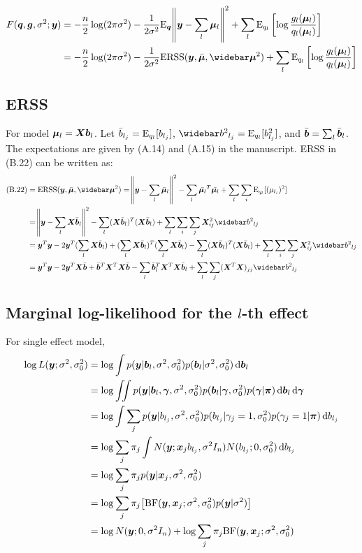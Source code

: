 \begin{align}
    F(\q,\g,\rv; \vy) &= -\frac{n}{2} \log(2\pi\rv) -\frac{1}{2\rv}\E_{\q}\norm{\vy-\sum_l \vmu_l}^2 + \sum_l \E_{q_l}\left[\log\frac{g_l(\vmu_l)}{q_l(\vmu_l)} \right] \label{eqn:Fexplicit}\\
    &= -\frac{n}{2} \log(2\pi\rv) - \frac{1}{2\rv} \ERSS(\vy,\emu,\emusq) + \sum_l \E_{q_l}\left[ \log\frac{g_l(\vmu_l)}{q_l(\vmu_l)} \right]  
\end{align}

\subsection{ERSS}

For \susie model $\bm \mu_l = \bm X \bm b_l$. Let $\bar{b}_{l_j} = \text{E}_{q_l}[b_{l_j}]$, $\bbb_{l_j} = \E_{q_l}[b^2_{l_j}]$, and $\bar{\bm{b}} = \sum_l \bar{\bm{b}}_{l}$. The expectations are given by (A.14) and (A.15) in the manuscript. ERSS in (B.22) can be written as:
\begin{align}
    \text{(B.22)} &= \ERSS(\vy,\emu,\emusq) = \norm{\vy-\sum_l \emul}^2 - \sum_l \bar{\vmu_l}^T \bar{\vmu_l} + \sum_l \sum_i \E_{q_l}[(\mu_{l_i})^2] \\
    &= \norm{\vy-\sum_l \mx \vbb_l}^2 - \sum_l (\mx \vbb_l)^T (\mx \vbb_l) + \sum_l \sum_i \sum_{j} \mx_{ij}^{2}  \bbb_{lj} \\
    &= \vy^T\vy - 2 \vy^T (\sum_l \mx \vbb_l) + (\sum_l \mx \vbb_l)^T(\sum_l \mx \vbb_l) - \sum_l (\mx \vbb_l)^T (\mx \vbb_l) + \sum_l \sum_i \sum_{j} \mx_{ij}^{2}  \bbb_{lj} \\
    &= \vy^T\vy - 2 \vy^T\mx \bar{\vb} + \bar{\vb}^T \mx^T\mx \bar{\vb} - \sum_l \bar{\vb}_l^T \mx^T \mx \bar{\vb}_l + \sum_l \sum_j (\mx^T \mx)_{jj} \bbb_{lj} \label{eqn:erss}
\end{align}

\subsection{Marginal log-likelihood for the $l$-th effect}

For single effect model,
\begin{align}
    \log L(\vy; \rv, \rv_0) &= \log \int p(\vy | \vb_l, \rv, \rv_0) p(\vb_l | \rv, \rv_0) \dif \vb_l\\
    &= \log \iint p(\vy | \vb_l, \vgamma, \rv, \rv_0) p(\vb_l | \vgamma, \rv_0) p(\vgamma | \vpi)  \dif \vb_l \dif \vgamma \\
    &= \log \int \sum_j p(\vy | b_{l_j}, \rv, \rv_0) p(b_{l_j}|\gamma_j = 1, \rv_0) p(\gamma_j = 1 | \vpi) \dif b_{l_j} \\
    &= \log \sum_j \pi_j \int N(\vy; \vx_jb_{l_j}, \rv I_n) N(b_{l_j}; 0, \rv_0) \dif b_{l_j} \\
    &= \log \sum_j \pi_j p(\vy|\vx_j, \rv, \rv_0) \\
    &= \log \sum_j \pi_j \big[\BF(\vy, \vx_j; \rv, \rv_0)p(\vy|\rv) \big]\\
    &= \log N(\vy; 0, \rv I_n) + \log \sum_j \pi_j \BF(\vy, \vx_j; \rv, \rv_0) \label{eqn:lmarginal}
\end{align}

